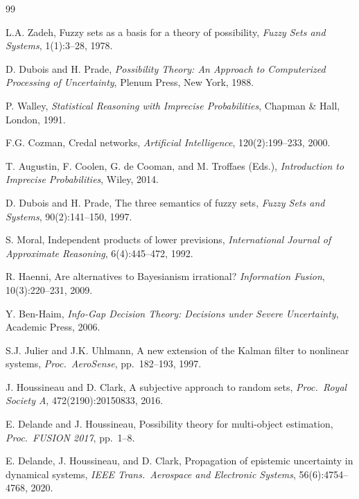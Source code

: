 \documentclass[12pt]{article}
\begin{document}
\begin{thebibliography}{99}

L.A. Zadeh, Fuzzy sets as a basis for a theory of possibility,
\textit{Fuzzy Sets and Systems}, 1(1):3--28, 1978.

D. Dubois and H. Prade, \textit{Possibility Theory: An Approach to
Computerized Processing of Uncertainty}, Plenum Press, New York, 1988.

P. Walley, \textit{Statistical Reasoning with Imprecise Probabilities},
Chapman \& Hall, London, 1991.

F.G. Cozman, Credal networks,
\textit{Artificial Intelligence}, 120(2):199--233, 2000.

T. Augustin, F. Coolen, G. de Cooman, and M. Troffaes (Eds.),
\textit{Introduction to Imprecise Probabilities}, Wiley, 2014.

D. Dubois and H. Prade, The three semantics of fuzzy sets,
\textit{Fuzzy Sets and Systems}, 90(2):141--150, 1997.

S. Moral, Independent products of lower previsions,
\textit{International Journal of Approximate Reasoning}, 6(4):445--472, 1992.

R. Haenni, Are alternatives to Bayesianism irrational?
\textit{Information Fusion}, 10(3):220--231, 2009.

Y. Ben-Haim, \textit{Info-Gap Decision Theory: Decisions under Severe
Uncertainty}, Academic Press, 2006.

S.J. Julier and J.K. Uhlmann, A new extension of the Kalman filter to
nonlinear systems, \textit{Proc.\ AeroSense}, pp.\ 182--193, 1997.

J. Houssineau and D. Clark, A subjective approach to random sets,
\textit{Proc.\ Royal Society A}, 472(2190):20150833, 2016.

E. Delande and J. Houssineau, Possibility theory for multi-object estimation,
\textit{Proc.\ FUSION 2017}, pp.\ 1--8.

E. Delande, J. Houssineau, and D. Clark, Propagation of epistemic uncertainty
in dynamical systems,
\textit{IEEE Trans.\ Aerospace and Electronic Systems}, 56(6):4754--4768, 2020.


\end{thebibliography}
\end{document}
